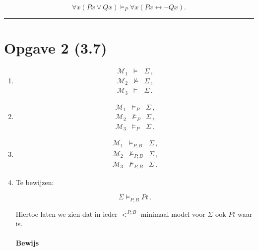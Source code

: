 \documentclass[a4paper,11pt]{article}
\begin{document}
\begin{displaymath}
\forall x (Px \vee Qx) \vDash_{P} \forall x (Px \leftrightarrow \neg Qx) \mbox{.}
\end{displaymath}

\hfill\rule{2.1mm}{2.mm}


\section*{Opgave 2 (3.7)}

\begin{enumerate}


\item

\begin{eqnarray*}
\mathcal{M}_{1} & \vDash & \Sigma  \, \mbox{,}\\
\mathcal{M}_{2} & \nvDash & \Sigma \, \mbox{,}\\
\mathcal{M}_{3} & \vDash & \Sigma  \, \mbox{.}
\end{eqnarray*}


\item

\begin{eqnarray*}
\mathcal{M}_{1} & \vDash_{P} & \Sigma  \, \mbox{,}\\
\mathcal{M}_{2} & \nvDash_{P} & \Sigma \, \mbox{,}\\
\mathcal{M}_{3} & \vDash_{P} & \Sigma  \, \mbox{.}
\end{eqnarray*}


\item

\begin{eqnarray*}
\mathcal{M}_{1} & \vDash_{P;B} & \Sigma  \, \mbox{,}\\
\mathcal{M}_{2} & \nvDash_{P;B} & \Sigma \, \mbox{,}\\
\mathcal{M}_{3} & \nvDash_{P;B} & \Sigma  \, \mbox{.}
\end{eqnarray*}


\item

Te bewijzen:

\begin{displaymath}
\Sigma \vDash_{P;B} Pt \, \mbox{.}
\end{displaymath}

Hiertoe laten we zien dat in ieder $<^{P;B}$-minimaal model voor $\Sigma$ ook
$Pt$ waar is.

\paragraph{Bewijs}


\end{enumerate}
\end{document}
